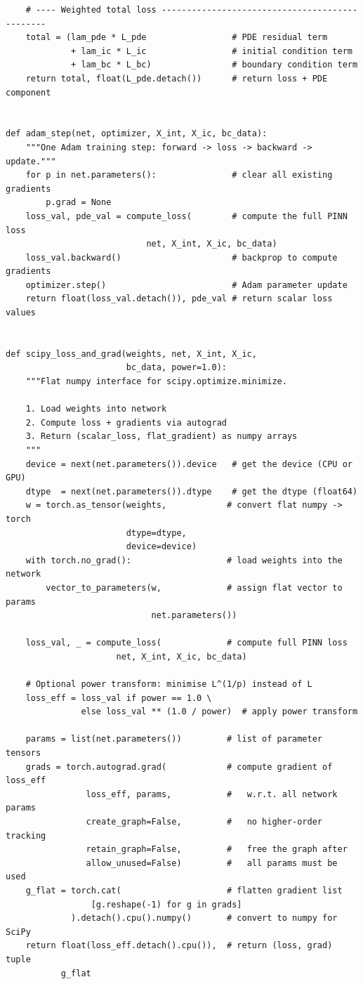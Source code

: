 \documentclass[11pt,a4paper]{article}
\begin{document}
\begin{lstlisting}
    # ---- Weighted total loss -----------------------------------------------
    total = (lam_pde * L_pde                 # PDE residual term
             + lam_ic * L_ic                 # initial condition term
             + lam_bc * L_bc)                # boundary condition term
    return total, float(L_pde.detach())      # return loss + PDE component


def adam_step(net, optimizer, X_int, X_ic, bc_data):
    """One Adam training step: forward -> loss -> backward -> update."""
    for p in net.parameters():               # clear all existing gradients
        p.grad = None
    loss_val, pde_val = compute_loss(        # compute the full PINN loss
                            net, X_int, X_ic, bc_data)
    loss_val.backward()                      # backprop to compute gradients
    optimizer.step()                         # Adam parameter update
    return float(loss_val.detach()), pde_val # return scalar loss values


def scipy_loss_and_grad(weights, net, X_int, X_ic,
                        bc_data, power=1.0):
    """Flat numpy interface for scipy.optimize.minimize.

    1. Load weights into network
    2. Compute loss + gradients via autograd
    3. Return (scalar_loss, flat_gradient) as numpy arrays
    """
    device = next(net.parameters()).device   # get the device (CPU or GPU)
    dtype  = next(net.parameters()).dtype    # get the dtype (float64)
    w = torch.as_tensor(weights,            # convert flat numpy -> torch
                        dtype=dtype,
                        device=device)
    with torch.no_grad():                   # load weights into the network
        vector_to_parameters(w,             # assign flat vector to params
                             net.parameters())

    loss_val, _ = compute_loss(             # compute full PINN loss
                      net, X_int, X_ic, bc_data)

    # Optional power transform: minimise L^(1/p) instead of L
    loss_eff = loss_val if power == 1.0 \
               else loss_val ** (1.0 / power)  # apply power transform

    params = list(net.parameters())         # list of parameter tensors
    grads = torch.autograd.grad(            # compute gradient of loss_eff
                loss_eff, params,           #   w.r.t. all network params
                create_graph=False,         #   no higher-order tracking
                retain_graph=False,         #   free the graph after
                allow_unused=False)         #   all params must be used
    g_flat = torch.cat(                     # flatten gradient list
                 [g.reshape(-1) for g in grads]
             ).detach().cpu().numpy()       # convert to numpy for SciPy
    return float(loss_eff.detach().cpu()),  # return (loss, grad) tuple
           g_flat



\end{lstlisting}
\end{document}
